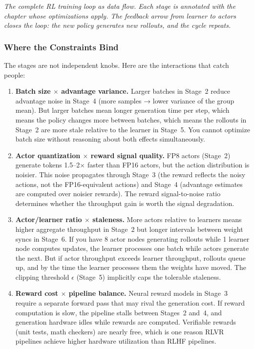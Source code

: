 \smallskip
\begin{center}
\textit{\small The complete RL training loop as data flow. Each stage is annotated with the chapter whose optimizations apply. The feedback arrow from learner to actors closes the loop: the new policy generates new rollouts, and the cycle repeats.}
\end{center}

\bigskip

\subsubsection*{Where the Constraints Bind}

The stages are not independent knobs. Here are the interactions that catch people:

\begin{enumerate}
  \item \textbf{Batch size $\times$ advantage variance.} Larger batches in Stage~2 reduce advantage noise in Stage~4 (more samples → lower variance of the group mean). But larger batches mean longer generation time per step, which means the policy changes more between batches, which means the rollouts in Stage~2 are more stale relative to the learner in Stage~5. You cannot optimize batch size without reasoning about both effects simultaneously.

  \item \textbf{Actor quantization $\times$ reward signal quality.} FP8 actors (Stage~2) generate tokens 1.5--2$\times$ faster than FP16 actors, but the action distribution is noisier. This noise propagates through Stage~3 (the reward reflects the noisy actions, not the FP16-equivalent actions) and Stage~4 (advantage estimates are computed over noisier rewards). The reward signal-to-noise ratio determines whether the throughput gain is worth the signal degradation.

  \item \textbf{Actor/learner ratio $\times$ staleness.} More actors relative to learners means higher aggregate throughput in Stage~2 but longer intervals between weight syncs in Stage~6. If you have 8 actor nodes generating rollouts while 1 learner node computes updates, the learner processes one batch while actors generate the next. But if actor throughput exceeds learner throughput, rollouts queue up, and by the time the learner processes them the weights have moved. The clipping threshold $\epsilon$ (Stage~5) implicitly caps the tolerable staleness.

  \item \textbf{Reward cost $\times$ pipeline balance.} Neural reward models in Stage~3 require a separate forward pass that may rival the generation cost. If reward computation is slow, the pipeline stalls between Stages~2 and~4, and generation hardware idles while rewards are computed. Verifiable rewards (unit tests, math checkers) are nearly free, which is one reason RLVR pipelines achieve higher hardware utilization than RLHF pipelines.
\end{enumerate}

